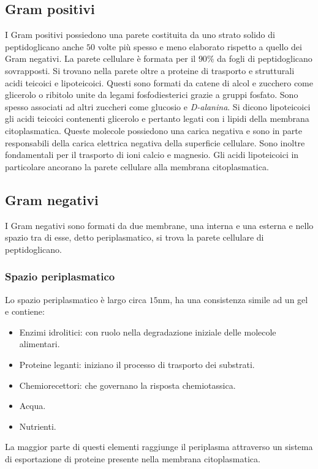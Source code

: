 \subsection{Gram positivi}
I Gram positivi possiedono una parete costituita da uno strato solido di peptidoglicano anche $50$ volte pi\`u spesso e meno elaborato rispetto a quello dei Gram negativi. La
parete cellulare \`e formata per il $90\%$ da fogli di peptidoglicano sovrapposti. Si trovano nella parete oltre a proteine di trasporto e strutturali acidi teicoici e lipoteicoici.
Questi sono formati da catene di alcol e zucchero come glicerolo o ribitolo unite da legami fosfodiesterici grazie a gruppi fosfato. Sono spesso associati ad altri zuccheri come
glucosio e \emph{D-alanina}. Si dicono lipoteicoici gli acidi teicoici contenenti glicerolo e pertanto legati con i lipidi della membrana citoplasmatica. Queste molecole possiedono una
carica negativa e sono in parte responsabili della carica elettrica negativa della superficie cellulare. Sono inoltre fondamentali per il trasporto di ioni calcio e magnesio. Gli
acidi lipoteicoici in particolare ancorano la parete cellulare alla membrana citoplasmatica.
\subsection{Gram negativi}
I Gram negativi sono formati da due membrane, una interna e una esterna e nello spazio tra di esse, detto periplasmatico, si trova la parete cellulare di peptidoglicano.
\subsubsection{Spazio periplasmatico}
Lo spazio periplasmatico \`e largo circa $15\si{\nano\metre}$, ha una consistenza simile ad un gel e contiene:
\begin{itemize}
	\item Enzimi idrolitici: con ruolo nella degradazione iniziale delle molecole alimentari.
	\item Proteine leganti: iniziano il processo di trasporto dei substrati.
	\item Chemiorecettori: che governano la risposta chemiotassica.
	\item Acqua.
	\item Nutrienti.
\end{itemize}
La maggior parte di questi elementi raggiunge il periplasma attraverso un sistema di esportazione di proteine presente nella membrana citoplasmatica.

